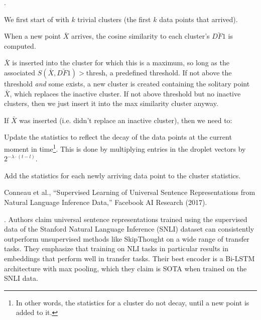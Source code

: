 \documentclass[11pt]{article}
\newcommand\myspace[1][]{\vspace{#1\bigskipamount}}
\newcommand\p{\Needspace{10\baselineskip} \noindent}
\begin{document}
\myspace
\p {}. 
\begin{compactenum}
	\item We first start of with $k$ trivial clusters (the first $k$ data points that arrived). 
	
	\item When a new point $\bar{X}$ arrives, the cosine similarity to each cluster's $\bar{DF1}$ is computed. 
	
	\item $\bar{X}$ is inserted into the cluster for which this is a maximum, so long as the associated $S(\bar{X}, \bar{DF1}) > \mathrm{thresh}$, a predefined threshold. If not above the threshold \textit{and} some  exists, a new cluster is created containing the solitary point $\bar{X}$, which replaces the inactive cluster. If not above threshold but no inactive clusters, then we just insert it into the max similarity cluster anyway.
	
	\item If $\bar{X}$ was inserted (i.e. didn't replace an inactive cluster), then we need to:
	\begin{compactenum}
		\item Update the statistics to reflect the decay of the data points at the current moment in time\footnote{In other words, the statistics for a cluster do not decay, until a new point is added to it.}. This is done by multiplying entries in the droplet vectors by $2^{-\lambda \cdot (t - l)}$.
		
		\item Add the statistics for each newly arriving data point to the cluster statistics.
	\end{compactenum}
\end{compactenum}




\vspace{-1em}
{\footnotesize Conneau et al., ``Supervised Learning of Universal Sentence Representations from Natural Language Inference Data,'' Facebook AI Research (2017).}

\p {}. Authors claim universal sentence representations trained using the supervised data of the Stanford Natural Language Inference (SNLI) dataset can consistently outperform unsupervised methods like SkipThought on a wide range of transfer tasks. They emphasize that training on NLI tasks in particular results in embeddings that perform well in transfer tasks. Their best encoder is a Bi-LSTM architecture with max pooling, which they claim is SOTA when trained on the SNLI data.
\end{document}
